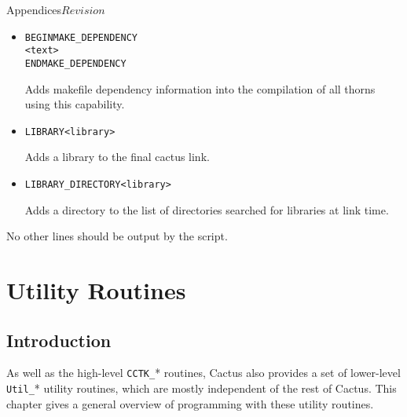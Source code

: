 \begin{cactuspart}{Appendices}{}{$Revision$}
\begin{itemize}
Adds a makefile definition into the compilation of all thorns using
this capability.

\item

\begin{alltt}
BEGIN MAKE_DEPENDENCY 
<text>
END MAKE_DEPENDENCY 
\end{alltt}

Adds makefile dependency information into the compilation of all
thorns using this capability.

\item

\begin{alltt}
LIBRARY <library>
\end{alltt}

Adds a library to the final cactus link.

\item

\begin{alltt}
LIBRARY_DIRECTORY <library>
\end{alltt}

Adds a directory to the list of directories searched for libraries at
link time.

\end{itemize}

No other lines should be output by the script.


\chapter{Utility Routines}

\section{Introduction}

As well as the high-level \verb|CCTK_|* routines, Cactus also
provides a set of lower-level \verb|Util_|* utility routines, which
are mostly independent of the rest of Cactus.  This chapter gives a
general overview of programming with these utility routines.



\end{cactuspart}
